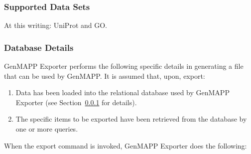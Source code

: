 \documentclass[11pt]{article}
\begin{document}
\subsubsection{Supported Data Sets}
\label{supportedDataSets}

At this writing: UniProt and GO.

\subsubsection{Database Details}

GenMAPP Exporter performs the following specific details in generating a file that can be used by GenMAPP.  It is assumed that, upon, export:
\begin{enumerate}
\item Data has been loaded into the relational database used by GenMAPP Exporter (see Section~\ref{supportedDataSets} for details).

\item The specific items to be exported have been retrieved from the database by one or more queries.
\end{enumerate}
When the export command is invoked, GenMAPP Exporter does the following:
\end{document}
